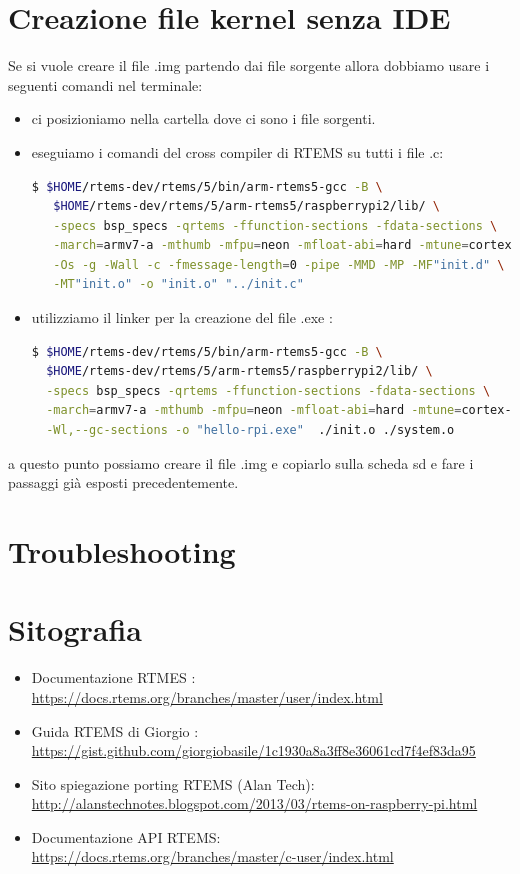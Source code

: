 \documentclass[10pt, a4paper]{article}
\begin{document}
\begin{flushleft}
\newpage
\section{Creazione file kernel senza IDE}
Se si vuole creare il file .img partendo dai file sorgente allora dobbiamo usare i seguenti comandi nel terminale:
\begin{itemize}
\item ci posizioniamo nella cartella dove ci sono i file sorgenti.
\item eseguiamo i comandi del cross compiler di RTEMS su tutti i file .c: 
\begin{lstlisting}[language= bash] 
 $ $HOME/rtems-dev/rtems/5/bin/arm-rtems5-gcc -B \
   $HOME/rtems-dev/rtems/5/arm-rtems5/raspberrypi2/lib/ \
   -specs bsp_specs -qrtems -ffunction-sections -fdata-sections \
   -march=armv7-a -mthumb -mfpu=neon -mfloat-abi=hard -mtune=cortex-a7 \
   -Os -g -Wall -c -fmessage-length=0 -pipe -MMD -MP -MF"init.d" \
   -MT"init.o" -o "init.o" "../init.c"
\end{lstlisting}
\item utilizziamo il linker per la creazione del file .exe :
\begin{lstlisting}[language= bash] 
$ $HOME/rtems-dev/rtems/5/bin/arm-rtems5-gcc -B \
  $HOME/rtems-dev/rtems/5/arm-rtems5/raspberrypi2/lib/ \
  -specs bsp_specs -qrtems -ffunction-sections -fdata-sections \
  -march=armv7-a -mthumb -mfpu=neon -mfloat-abi=hard -mtune=cortex-a7 \
  -Wl,--gc-sections -o "hello-rpi.exe"  ./init.o ./system.o    
\end{lstlisting}

\end{itemize}
\item a questo punto possiamo creare il file .img e copiarlo sulla scheda sd e fare i passaggi già esposti precedentemente.

\newpage
\section{Troubleshooting}

\newpage
\section{Sitografia}
\begin{itemize}
\item Documentazione RTMES :\\ \url{https://docs.rtems.org/branches/master/user/index.html}
\item Guida RTEMS di Giorgio :\\ \url{https://gist.github.com/giorgiobasile/1c1930a8a3ff8e36061cd7f4ef83da95}
\item Sito spiegazione porting RTEMS (Alan Tech):\\ \url{http://alanstechnotes.blogspot.com/2013/03/rtems-on-raspberry-pi.html} 
\item Documentazione API RTEMS:\\ \url{https://docs.rtems.org/branches/master/c-user/index.html}
\end{itemize}

\end{flushleft}
\end{document}
